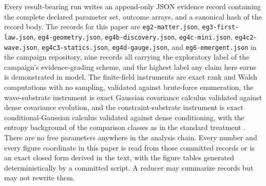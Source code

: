 \documentclass[aps,pre,reprint,nofootinbib]{revtex4-2}
\begin{document}
Every result-bearing run writes an append-only JSON evidence record
containing the complete declared parameter set, outcome arrays, and
a canonical hash of the record body.  The records for this paper are
\texttt{eg2-matter.json}, \texttt{eg3-first-law.json},
\texttt{eg4-geometry.json}, \texttt{eg4b-discovery.json},
\texttt{eg4c-mini.json}, \texttt{eg4c2-wave.json},
\texttt{eg4c3-statics.json}, \texttt{eg4d-gauge.json}, and
\texttt{eg6-emergent.json} in the
campaign repository, nine records all carrying the exploratory
label of the campaign's evidence-grading scheme, and the highest
label any claim here earns is demonstrated in model.  The
finite-field instruments are exact rank and Walsh computations with
no sampling, validated against brute-force enumeration, the
wave-substrate instrument is exact Gaussian covariance calculus
validated against dense covariance evolution, and the
constraint-substrate instrument is exact conditional-Gaussian
calculus validated against dense conditioning, with the entropy
background of the comparison classes as in the standard treatment
\cite{CoverThomas2006}.  There are no free parameters anywhere in
the analysis chain.  Every number and every figure coordinate in
this paper is read from those committed records or is an exact
closed form derived in the text, with the figure tables generated
deterministically by a committed script.  A reducer may summarize
records but may not rewrite them.
\end{document}
